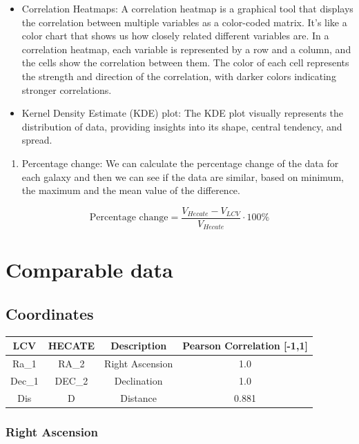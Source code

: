 \documentclass[
]{article}
\providecommand{\tightlist}{%
  \setlength{\itemsep}{0pt}\setlength{\parskip}{0pt}}\usepackage{longtable,booktabs,array}
\begin{document}
\begin{itemize}
\item
  Correlation Heatmaps: A correlation heatmap is a graphical tool that
  displays the correlation between multiple variables as a color-coded
  matrix. It's like a color chart that shows us how closely related
  different variables are. In a correlation heatmap, each variable is
  represented by a row and a column, and the cells show the correlation
  between them. The color of each cell represents the strength and
  direction of the correlation, with darker colors indicating stronger
  correlations.
\item
  Kernel Density Estimate (KDE) plot: The KDE plot visually represents
  the distribution of data, providing insights into its shape, central
  tendency, and spread.
\end{itemize}

\begin{enumerate}
\def\labelenumi{\arabic{enumi}.}
\setcounter{enumi}{4}
\tightlist
\item
  Percentage change: We can calculate the percentage change of the data
  for each galaxy and then we can see if the data are similar, based on
  minimum, the maximum and the mean value of the difference.
\end{enumerate}

\[\text{Percentage change} = \frac{V_{Hecate} - V_{LCV}}{V_{Hecate}}\cdot 100 \%\]

\section{Comparable data}\label{comparable-data}

\subsection{Coordinates}\label{coordinates}

\begin{longtable}[]{@{}cccc@{}}
\toprule\noalign{}
LCV & HECATE & Description & Pearson Correlation {[}-1,1{]} \\
\midrule\noalign{}
\endhead
\bottomrule\noalign{}
\endlastfoot
Ra\_1 & RA\_2 & Right Ascension & 1.0 \\
Dec\_1 & DEC\_2 & Declination & 1.0 \\
Dis & D & Distance & 0.881 \\
\end{longtable}

\subsubsection{Right Ascension}
\end{document}
